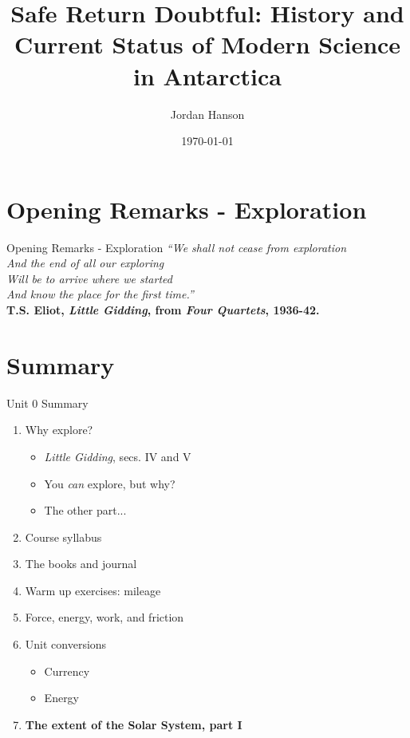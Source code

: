 \documentclass{beamer}
\title{Safe Return Doubtful: History and Current Status of Modern Science in Antarctica}
\date{\today}
\author{Jordan Hanson}
\institute{Whittier College Department of Physics and Astronomy}
\begin{document}
\maketitle

\section{Opening Remarks - Exploration}

\begin{frame}{Opening Remarks - Exploration}
\textit{``We shall not cease from exploration \\
And the end of all our exploring \\
Will be to arrive where we started \\
And know the place for the first time.''} \\  \vspace{1cm} \textbf{T.S. Eliot, \textit{Little Gidding}, from  \textit{Four Quartets}, 1936-42.}
\end{frame}

\section{Summary}

\begin{frame}{Unit 0 Summary}
\begin{enumerate}
\item Why explore?
\begin{itemize}
\item \textit{Little Gidding}, secs. IV and V
\item You \textit{can} explore, but why?
\item The other part...
\end{itemize}
\item Course syllabus
\item The books and journal
\item Warm up exercises: mileage
\item Force, energy, work, and friction
\item Unit conversions
\begin{itemize}
\item Currency
\item Energy
\end{itemize}
\item \textbf{The extent of the Solar System, part I}
\end{enumerate}
\end{frame}
\end{document}

